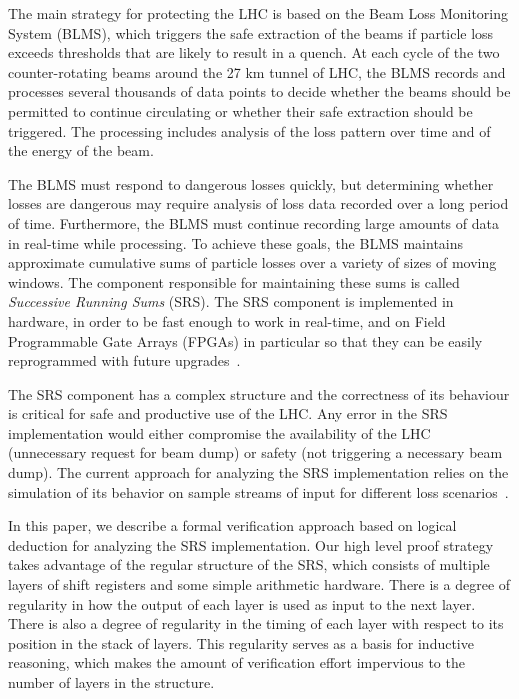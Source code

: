 \documentclass{llncs}
\begin{document}
The main strategy for protecting the LHC is based on the Beam Loss Monitoring System (BLMS), which triggers the safe extraction of the beams if particle loss exceeds thresholds that are likely to result in a quench.
At each cycle of the two counter-rotating beams around the 27 km tunnel of LHC, the BLMS records and processes several thousands of data points to decide whether the beams should be permitted to continue circulating or whether their safe extraction should be triggered.
The processing includes analysis of the loss pattern over time and of the energy of the beam.

The BLMS must respond to dangerous losses quickly, but determining whether losses are dangerous may require analysis of loss data recorded over a long period of time.
Furthermore, the BLMS must continue recording large amounts of data in real-time while processing.
To achieve these goals, the BLMS maintains approximate cumulative sums of particle losses over a variety of sizes of moving windows.
The component responsible for maintaining these sums is called \emph{Successive Running Sums} (SRS).
The SRS component is implemented in hardware, in order to be fast enough to work in real-time, and on Field Programmable Gate Arrays (FPGAs) in particular so that they can be easily reprogrammed with future upgrades~\cite{Chris-FPGA}.

The SRS component has a complex structure and the correctness of its behaviour is critical for safe and productive use of the LHC.
Any error in the SRS implementation would either compromise the availability of the LHC (unnecessary request for beam dump) or safety (not triggering a necessary beam dump).
The current approach for analyzing the SRS implementation relies on the simulation of its behavior on sample streams of input for different loss scenarios~\cite{Chris-thesis}.

In this paper, we describe a formal verification approach based on logical deduction for analyzing the SRS implementation.
Our high level proof strategy takes advantage of the regular structure of the SRS, which consists of multiple layers of shift registers and some simple arithmetic hardware.
There is a degree of regularity in how the output of each layer is used as input to the next layer.
There is also a degree of regularity in the timing of each layer with respect to its position in the stack of layers.
This regularity serves as a basis for inductive reasoning, which makes the amount of verification effort impervious to the number of layers in the structure.
\end{document}
